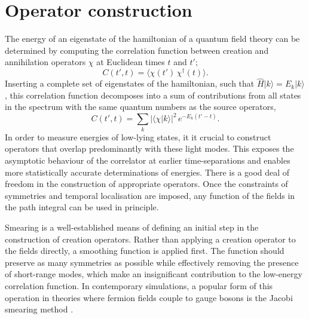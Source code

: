 \section{Operator construction\label{sec:theory}}

The energy of an eigenstate of the hamiltonian of a quantum field
theory can be determined by computing the correlation function between
creation and annihilation operators $\chi$ at Euclidean times $t$ and $t'$;
\begin{equation}
   C(t',t)  = \Big\langle \chi(t')\,  \chi^\dagger(t) \Big\rangle.
\end{equation}
Inserting a complete set of eigenstates of the hamiltonian, such that
$\hat{H} | k \rangle = E_k  | k\rangle$, this correlation function
decomposes into a sum of contributions from all states in the spectrum
with the same quantum numbers as the source operators,
\begin{equation}
   C(t',t)  = \sum_k \big|\langle \chi | k \rangle\big|^2 \, e^{-{E_k} (t'-t)}.
\end{equation}
In order to
measure energies of low-lying states, it it crucial to construct operators that
overlap predominantly with these light modes.
This exposes the asymptotic behaviour of the correlator at earlier
time-separations and enables more statistically accurate determinations of
energies.
There is a good deal of freedom in
the construction of appropriate operators. Once the constraints of symmetries
and temporal localisation are imposed, any function of the fields in the path
integral can be used in principle.

Smearing is a well-established means of defining an initial step in the
construction of creation operators. Rather than applying a creation operator to
the fields directly, a smoothing function is applied first. The function should
preserve as many symmetries as possible while effectively removing the
presence of short-range modes, which make an insignificant contribution to the
low-energy correlation function. In contemporary simulations, a popular form
of this operation in theories where fermion fields couple to gauge bosons is
the Jacobi smearing method \cite{Allton:1993wc}.

